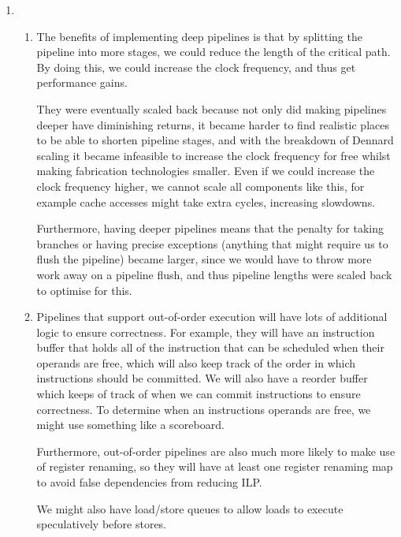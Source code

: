 


\begin{enumerate}[label=(\alph*)]

  \item
    \begin{enumerate}[label=(\roman*)]

      \item
        The benefits of implementing deep pipelines is that by splitting the pipeline into more stages, we could reduce the length of the critical path. By doing this, we could increase the clock frequency, and thus get performance gains.

        They were eventually scaled back because not only did making pipelines deeper have diminishing returns, it became harder to find realistic places to be able to shorten pipeline stages, and with the breakdown of Dennard scaling it became infeasible to increase the clock frequency for free whilst making fabrication technologies smaller. Even if we could increase the clock frequency higher, we cannot scale all components like this, for example cache accesses might take extra cycles, increasing slowdowns.

        Furthermore, having deeper pipelines means that the penalty for taking branches or having precise exceptions (anything that might require us to flush the pipeline) became larger, since we would have to throw more work away on a pipeline flush, and thus pipeline lengths were scaled back to optimise for this.

        \item

          Pipelines that support out-of-order execution will have lots of additional logic to ensure correctness. For example, they will have an instruction buffer that holds all of the instruction that can be scheduled when their operands are free, which will also keep track of the order in which instructions should be committed. We will also have a reorder buffer which keeps of track of when we can commit instructions to ensure correctness. To determine when an instructions operands are free, we might use something like a scoreboard.

          Furthermore, out-of-order pipelines are also much more likely to make use of register renaming, so they will have at least one register renaming map to avoid false dependencies from reducing ILP.

          We might also have load/store queues to allow loads to execute speculatively before stores.



\end{enumerate}
\end{enumerate}
